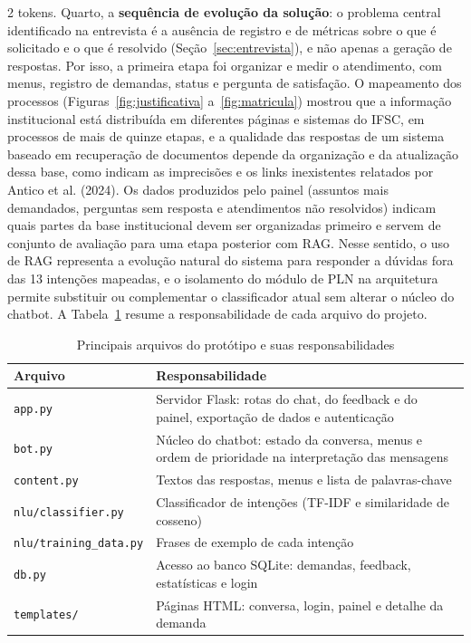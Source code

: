 \documentclass[10pt]{article}
\begin{document}
\begin{multicols}{2}
tokens. Quarto, a \textbf{sequência de evolução da solução}: o problema central identificado na entrevista é a ausência de registro e de métricas sobre o que é solicitado e o que é resolvido (Seção~\ref{sec:entrevista}), e não apenas a geração de respostas. Por isso, a primeira etapa foi organizar e medir o atendimento, com menus, registro de demandas, status e pergunta de satisfação. O mapeamento dos processos (Figuras~\ref{fig:justificativa} a~\ref{fig:matricula}) mostrou que a informação institucional está distribuída em diferentes páginas e sistemas do IFSC, em processos de mais de quinze etapas, e a qualidade das respostas de um sistema baseado em recuperação de documentos depende da organização e da atualização dessa base, como indicam as imprecisões e os links inexistentes relatados por Antico et al. (2024). Os dados produzidos pelo painel (assuntos mais demandados, perguntas sem resposta e atendimentos não resolvidos) indicam quais partes da base institucional devem ser organizadas primeiro e servem de conjunto de avaliação para uma etapa posterior com RAG. Nesse sentido, o uso de RAG representa a evolução natural do sistema
para responder a dúvidas fora das 13 intenções mapeadas, e o isolamento do
módulo de PLN na arquitetura permite substituir ou complementar o
classificador atual sem alterar o núcleo do chatbot. A Tabela~\ref{tab:modulos} resume a
responsabilidade de cada arquivo do projeto.

\end{multicols}
\begin{table}[H]
  \centering
  \begin{tabular}{|p{}|p{}|}
    \hline
    \textbf{Arquivo} & \textbf{Responsabilidade} \\ \hline
    \texttt{app.py} & Servidor Flask: rotas do chat, do feedback e do painel,
    exportação de dados e autenticação \\ \hline
    \texttt{bot.py} & Núcleo do chatbot: estado da conversa, menus e ordem de
    prioridade na interpretação das mensagens \\ \hline
    \texttt{content.py} & Textos das respostas, menus e lista de palavras-chave \\ \hline
    \texttt{nlu/classifier.py} & Classificador de intenções (TF-IDF e
    similaridade de cosseno) \\ \hline
    \texttt{nlu/training\_data.py} & Frases de exemplo de cada intenção \\ \hline
    \texttt{db.py} & Acesso ao banco SQLite: demandas, feedback, estatísticas e
    login \\ \hline
    \texttt{templates/} & Páginas HTML: conversa, login, painel e detalhe da
    demanda \\ \hline
  \end{tabular}
  \caption{Principais arquivos do protótipo e suas responsabilidades}
  \label{tab:modulos}
\end{table}
\end{document}
